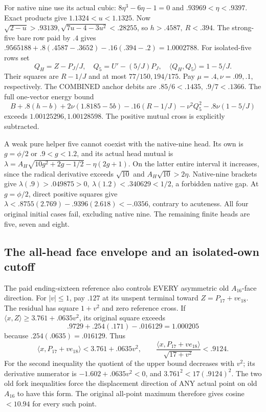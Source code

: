 \documentclass[11pt]{article}
\theoremstyle{definition}
\theoremstyle{remark}
\newcommand{\ip}[2]{\langle #1,#2\rangle}
\begin{document}
For native nine use its actual cubic:
\(8\eta^3-6\eta-1=0\) and
\(.93969<\eta<.9397\).
Exact products give \(1.1324<u<1.1325\).
Now
\(\sqrt{2-u}>.93139,\sqrt{7u-4-3u^2}<.28255\),
so \(h>.4587,\ R<.394\).
The strong-five bare row paid by \(.4\) gives
\(.9565188+.8(.4587-.3652)-.16(.394-.2)=1.0002788\).
For isolated-five rows set
\[
 Q_H=Z-P_J/J,\quad Q_5=U'-(5/J)P_J,\quad
 \ip{Q_H}{Q_5}=1-5/J .
\]
Their squares are \(R-1/J\) and at most \(77/150,194/175\).
Pay \(\mu=.4,\nu=.09,.1\), respectively.
The COMBINED anchor debits are \(.85/6<.1435,\ .9/7<.1366\).
The full one-vector energy bound
\[
 B+.8(h-b)+2\nu(1.8185-5b)
  -.16(R-1/J)-\nu^2Q_5^2-.8\nu(1-5/J)
\]
exceeds \(1.00125296,1.00128598\).
The positive mutual cross is explicitly subtracted.

A weak pure helper five cannot coexist with the native-nine head.
Its own is \(g=\phi/2\) or \(.9<g<1.2\), and its actual head
mutual is
\(\lambda=A_H\sqrt{10g^2+2g-1/2}-\eta(2g+1)\).
On the latter entire interval it increases, since the radical
derivative exceeds \(\sqrt{10}\) and \(A_H\sqrt{10}>2\eta\).
Native-nine brackets give
\(\lambda(.9)>.049875>0,\ \lambda(1.2)<.340629<1/2\),
a forbidden native gap.
At \(g=\phi/2\), direct positive squares give
\(\lambda<.8755(2.769)-.9396(2.618)<-.0356\),
contrary to acuteness.
All four original initial cases fail, excluding native nine.
The remaining finite heads are five, seven and eight.

\subsection{The all-head face envelope and an isolated-own cutoff}
\label{app:D18faceenvelope}
The paid ending-sixteen reference also controls EVERY asymmetric old
\(A_{16}\)-face direction. For \(|v|\leq1\), pay \(.127\)
at its unspent terminal toward \(Z=P_{17}+ve_{18}\).
The residual has square \(1+v^2\) and zero reference cross.
If \(\ip xZ\geq3.761+.0635v^2\), its original square exceeds
\[
 .9729+.254(.171)-.016129=1.000205
\]
because \(.254(.0635)=.016129\).
Thus
\begin{equation}\label{eq:D18faceenvelope}
 \ip x{P_{17}+ve_{18}}<3.761+.0635v^2,\qquad
 \frac{\ip x{P_{17}+ve_{18}}}{\sqrt{17+v^2}}<.9124 .
\end{equation}
For the second inequality the quotient of the upper bound decreases
with \(v^2\); its derivative numerator is
\(-1.602+.0635v^2<0\), and \(3.761^2<17(.9124)^2\).
The two old fork inequalities force the displacement direction of
ANY actual point on old \(A_{16}\) to have this form.
The original all-point maximum therefore gives cosine \(<10.94\)
for every such point.
\end{document}
